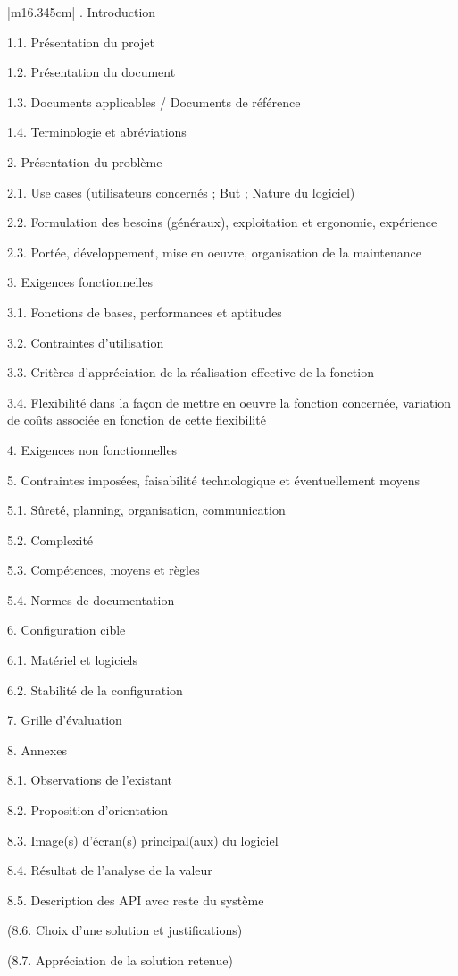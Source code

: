 \documentclass{article}
\begin{document}
\begin{flushleft}
\tablehead{}
\begin{supertabular}{|m{16.345cm}|}
. Introduction

1.1. Présentation du projet

1.2. Présentation du document

1.3. Documents applicables / Documents de référence

1.4. Terminologie et abréviations

2. Présentation du problème

2.1. Use cases (utilisateurs concernés ; But ; Nature du logiciel)

2.2. Formulation des besoins (généraux), exploitation et ergonomie,
expérience

2.3. Portée, développement, mise en oeuvre, organisation de la
maintenance

3. Exigences fonctionnelles

3.1. Fonctions de bases, performances et aptitudes

3.2. Contraintes d’utilisation

3.3. Critères d’appréciation de la réalisation effective de la fonction

3.4. Flexibilité dans la façon de mettre en oeuvre la fonction
concernée, variation de coûts associée en fonction de cette flexibilité

4. Exigences non fonctionnelles

5. Contraintes imposées, faisabilité technologique et éventuellement
moyens

5.1. Sûreté, planning, organisation, communication

5.2. Complexité

5.3. Compétences, moyens et règles

5.4. Normes de documentation

6. Configuration cible

6.1. Matériel et logiciels

6.2. Stabilité de la configuration

7. Grille d’évaluation

8. Annexes

8.1. Observations de l’existant

8.2. Proposition d’orientation

8.3. Image(s) d’écran(s) principal(aux) du logiciel

8.4. Résultat de l’analyse de la valeur

8.5. Description des API avec reste du système

(8.6. Choix d’une solution et justifications)

(8.7. Appréciation de la solution retenue)\\\hline
\end{supertabular}
\end{flushleft}
\end{document}
